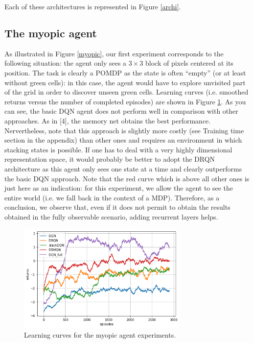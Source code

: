 \documentclass{article} %
\begin{document}
	Each of these architectures is represented in Figure \ref{archi}. 
	
	\subsection{The myopic agent}
	
	As illustrated in Figure \ref{myopic}, our first experiment corresponds to the following situation: the agent only sees a $3\times3$ block of pixels centered at its position. The task is clearly a POMDP as the state is often ``empty'' (or at least without green cells): in this case, the agent would have to explore unvisited part of the grid in order to discover unseen green cells. Learning curves (i.e. smoothed returns versus the number of completed episodes) are shown in Figure \ref{myopic_curves}. As you can see, the basic DQN agent does not perform well in comparison with other approaches. As in [4], the memory net obtains the best performance. Nervertheless, note that this approach is slightly more costly (see Training time section in the appendix) than other ones and requires an environment in which stacking states is possible. If one has to deal with a very highly dimensional representation space, it would probably be better to adopt the DRQN architecture as this agent only sees one state at a time and clearly outperforms the basic DQN approach. Note that the red curve which is above all other ones is just here as an indication: for this experiment, we allow the agent to see the entire world (i.e. we fall back in the context of a MDP). Therefore, as a conclusion, we observe that, even if it does not permit to obtain the results obtained in the fully observable scenario, adding recurrent layers helps. 
	
	\begin{figure}
		\includegraphics[width=0.75\textwidth]{imgs/myopic_curves.png}
		\caption{Learning curves for the myopic agent experiments.}
		\label{myopic_curves}
	\end{figure}
	
\end{document}
